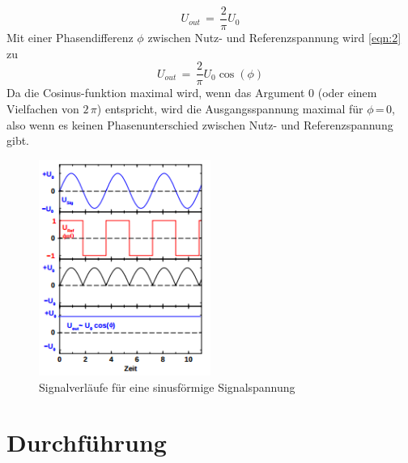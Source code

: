 \documentclass[
  bibliography=totoc,     %
  captions=tableheading,  %
  titlepage=firstiscover, %
]{scrartcl}
\begin{document}
\begin{equation}
  U_{out}\,=\,\frac{2}{\pi}U_0
\end{equation}
\label{eqn:2}
Mit einer Phasendifferenz $\phi$ zwischen Nutz- und Referenzspannung wird
\ref{eqn:2} zu
\begin{equation}
  U_{out}\,=\,\frac{2}{\pi}U_0\cos(\phi)
\end{equation}
\label{eqn:3}
Da die Cosinus-funktion maximal wird, wenn das Argument 0 (oder einem Vielfachen
von $2\,\pi$) entspricht, wird die Ausgangsspannung maximal für $\phi$\,=\,0,
also wenn es keinen Phasenunterschied zwischen Nutz- und Referenzspannung gibt.
\begin{figure}[htb]
  \centering
  \includegraphics[width=0.5\textwidth]{V3034.png}
  \caption{Signalverläufe für eine sinusförmige Signalspannung}
  \label{fig:V3034}
\end{figure}
\newpage
\section{Durchführung}
\label{sec:durchführung}
\end{document}
